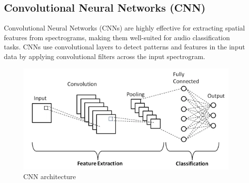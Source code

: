 



\subsection{Convolutional Neural Networks (CNN)}

Convolutional Neural Networks (CNNs) are highly effective for extracting
spatial features from spectrograms, making them well-suited for audio
classification tasks. CNNs use convolutional layers to detect patterns and
features in the input data by applying convolutional filters across the input
spectrogram.

\begin{figure}[h!]
    \centering
    \includegraphics{images/Convolution.png}
    \caption{CNN architecture}%
\end{figure}

